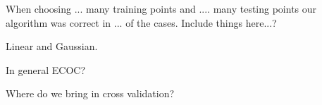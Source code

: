 When choosing ... many training points and .... many testing points our algorithm was correct in ... of the cases. Include things here...?

Linear and Gaussian.

In general ECOC?

Where do we bring in cross validation?


